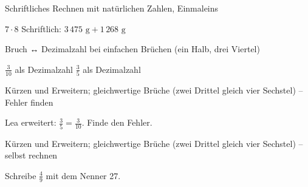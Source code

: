 \begin{aufgabe}{Schriftliches Rechnen mit natürlichen Zahlen, Einmaleins}
\begin{teile}
\teil $7 \cdot 8$
\teil Schriftlich: $3\,475\text{ g} + 1\,268\text{ g}$
\end{teile}
\end{aufgabe}

\begin{aufgabe}{Bruch ↔ Dezimalzahl bei einfachen Brüchen (ein Halb, drei Viertel)}
\begin{teile}
\teil $\frac{3}{10}$ als Dezimalzahl
\teil $\frac{3}{5}$ als Dezimalzahl
\end{teile}
\end{aufgabe}

\begin{aufgabe}{Kürzen und Erweitern; gleichwertige Brüche (zwei Drittel gleich vier Sechstel) – Fehler finden}
\begin{teile}
\teil Lea erweitert: $\frac{3}{5} = \frac{3}{10}$. Finde den Fehler.
\end{teile}
\end{aufgabe}

\begin{aufgabe}{Kürzen und Erweitern; gleichwertige Brüche (zwei Drittel gleich vier Sechstel) – selbst rechnen}
\begin{teile}
\teil Schreibe $\frac{4}{9}$ mit dem Nenner 27.
\end{teile}
\end{aufgabe}
